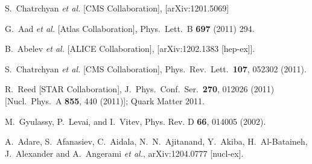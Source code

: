 \documentclass[article,showpacs,preprintnumbers,amsmath,amssymb]{revtex4}
\begin{document}
\begin{thebibliography}{80}
  S.~Chatrchyan {\it et al.}  [CMS Collaboration],
  [arXiv:1201.5069]


\bibitem{:2010px}
  G.~Aad {\it et al.}  [Atlas Collaboration],
  Phys.\ Lett.\  B {\bf 697} (2011) 294.

  B.~Abelev {\it et al.}  [ALICE Collaboration],
  [arXiv:1202.1383 [hep-ex]].

  S.~Chatrchyan {\it et al.}  [CMS Collaboration],
  Phys.\ Rev.\ Lett.\  {\bf 107}, 052302 (2011).


  R.~Reed [STAR Collaboration],
  J.\ Phys.\ Conf.\ Ser.\  {\bf 270}, 012026 (2011)
  [Nucl.\ Phys.\ A {\bf 855}, 440 (2011)]; Quark Matter 2011.

 M.~Gyulassy, P.~Levai, and I.~Vitev,
 Phys. Rev. D {\bf{66}}, 014005 (2002).  

  A.~Adare, S.~Afanasiev, C.~Aidala, N.~N.~Ajitanand, Y.~Akiba, H.~Al-Bataineh, J.~Alexander and A.~Angerami {\it et al.},
  arXiv:1204.0777 [nucl-ex].

\end{thebibliography}
\end{document}
